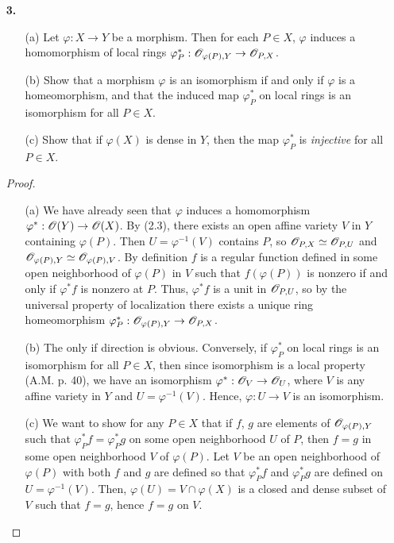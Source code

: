 \documentclass{article}
\begin{document}
\begin{enumerate} [label=\textbf{\arabic*.}, leftmargin=-0.05em]
\item[\textbf{3.}] \begin{itemize}
    \item[(a)] Let $\varphi : X \to Y$ be a morphism. Then for each $P \in X$, $\varphi$ induces a homomorphism of local rings $\varphi_P^* : \mathscr{O}_{\varphi(P), Y} \to \mathscr{O}_{P, X}$.
    \item[(b)] Show that a morphism $\varphi$ is an isomorphism if and only if $\varphi$ is a homeomorphism, and that the induced map $\varphi_P^*$ on local rings is an isomorphism for all $P \in X$.
    \item[(c)] Show that if $\varphi(X)$ is dense in $Y$, then the map $\varphi_P^*$ is \textit{injective} for all $P \in X$.
\end{itemize}

\begin{proof} $ $ \vspace{0pt}
    \begin{itemize} [leftmargin=0cm]
        \item[(a)] We have already seen that $\varphi$ induces a homomorphism $\varphi^* : \mathscr{O}(Y) \to \mathscr{O}(X)$.
        By (2.3), there exists an open affine variety $V$ in $Y$ containing $\varphi(P)$. Then $U = \varphi^{-1}(V)$ contains $P$, so $\mathscr{O}_{P, X} \simeq \mathscr{O}_{P, U}$ and $\mathscr{O}_{\varphi(P), Y} \simeq \mathscr{O}_{\varphi(P), V}$.
        By definition $f$ is a regular function defined in some open neighborhood of $\varphi(P)$ in $V$ such that $f(\varphi(P))$ is nonzero if and only if $\varphi^*f$ is nonzero at $P$.
        Thus, $\varphi^*f$ is a unit in $\mathscr{O}_{P, U}$, so by the universal property of localization there exists a unique ring homeomorphism $\varphi_P^* : \mathscr{O}_{\varphi(P),Y} \to \mathscr{O}_{P, X}$.

        \item[(b)] The only if direction is obvious.
        Conversely, if $\varphi_P^*$ on local rings is an isomorphism for all $P \in X$, then since isomorphism is a local property (A.M. p. 40), we have an isomorphism $\varphi^* : \mathscr{O}_V \to \mathscr{O}_U$, where $V$ is any affine variety in $Y$ and $U = \varphi^{-1}(V)$.
        Hence, $\varphi : U \to V$ is an isomorphism.

        \item[(c)] We want to show for any $P \in X$ that if $f$, $g$ are elements of $\mathscr{O}_{\varphi(P), Y}$ such that $\varphi_P^*f = \varphi_P^*g$ on some open neighborhood $U$ of $P$, then $f = g$ in some open neighborhood $V$ of $\varphi(P)$.
        Let $V$ be an open neighborhood of $\varphi(P)$ with both $f$ and $g$ are defined so that $\varphi_P^*f$ and $\varphi_P^*g$ are defined on $U = \varphi^{-1}(V)$.
        Then, $\varphi(U) = V \cap \varphi(X)$ is a closed and dense subset of $V$ such that $f = g$, hence $f = g$ on $V$.
    \end{itemize}
\end{proof}


\end{enumerate}
\end{document}
